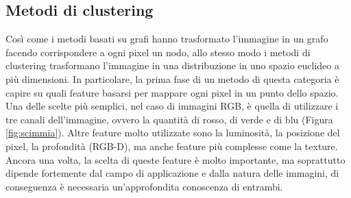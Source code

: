 










\subsection{Metodi di clustering}
\label{metodi_clustering}
Così come i metodi basati su grafi hanno trasformato l'immagine in un grafo facendo corrispondere a ogni pixel un nodo, allo stesso modo i metodi di clustering trasformano l'immagine in una distribuzione in uno spazio euclideo a più dimensioni. In particolare, la prima fase di un metodo di questa categoria è capire su quali feature basarsi per mappare ogni pixel in un punto dello spazio. Una delle scelte più semplici, nel caso di immagini RGB, è quella di utilizzare i tre canali dell'immagine, ovvero la quantità di rosso, di verde e di blu (Figura \ref{fig:scimmia}). Altre feature molto utilizzate sono la luminosità, la posizione del pixel, la profondità (RGB-D), ma anche feature più complesse come la texture. Ancora una volta, la scelta di queste feature è molto importante, ma soprattutto dipende fortemente dal campo di applicazione e dalla natura delle immagini, di conseguenza è necessaria un'approfondita conoscenza di entrambi.

